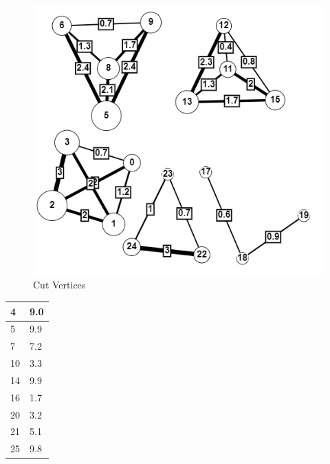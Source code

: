 \begin{figure}[htb!]
  \centering
  \includegraphics[width=\textwidth]{figures/cut_sample_2.png}
  \caption{Cut Vertices}
  \label{fig: cut_vertex}
\end{figure}

\begin{table}[]
  \centering
  \begin{tabular}{|l|l|}
    \hline
    4  & 9.0 \\ \hline
    5  & 9.9 \\ \hline
    7  & 7.2 \\ \hline
    10 & 3.3 \\ \hline
    14 & 9.9 \\ \hline
    16 & 1.7 \\ \hline
    20 & 3.2 \\ \hline
    21 & 5.1 \\ \hline
    25 & 9.8 \\ \hline
  \end{tabular}
\end{table}